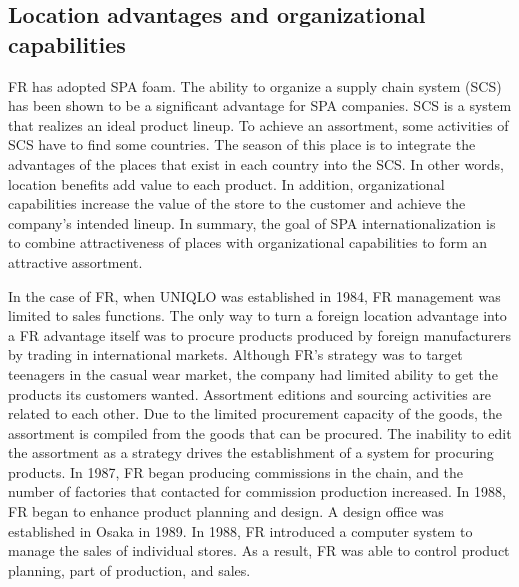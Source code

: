 \documentclass[12pt,]{article}
\begin{document}
\hypertarget{location-advantages-and-organizational-capabilities}{%
\subsection{Location advantages and organizational
capabilities}\label{location-advantages-and-organizational-capabilities}}

FR has adopted SPA foam. The ability to organize a supply chain system
(SCS) has been shown to be a significant advantage for SPA companies.
SCS is a system that realizes an ideal product lineup. To achieve an
assortment, some activities of SCS have to find some countries. The
season of this place is to integrate the advantages of the places that
exist in each country into the SCS. In other words, location benefits
add value to each product. In addition, organizational capabilities
increase the value of the store to the customer and achieve the
company's intended lineup. In summary, the goal of SPA
internationalization is to combine attractiveness of places with
organizational capabilities to form an attractive assortment.

In the case of FR, when UNIQLO was established in 1984, FR management
was limited to sales functions. The only way to turn a foreign location
advantage into a FR advantage itself was to procure products produced by
foreign manufacturers by trading in international markets. Although FR's
strategy was to target teenagers in the casual wear market, the company
had limited ability to get the products its customers wanted. Assortment
editions and sourcing activities are related to each other. Due to the
limited procurement capacity of the goods, the assortment is compiled
from the goods that can be procured. The inability to edit the
assortment as a strategy drives the establishment of a system for
procuring products. In 1987, FR began producing commissions in the
chain, and the number of factories that contacted for commission
production increased. In 1988, FR began to enhance product planning and
design. A design office was established in Osaka in 1989. In 1988, FR
introduced a computer system to manage the sales of individual stores.
As a result, FR was able to control product planning, part of
production, and sales.
\end{document}
